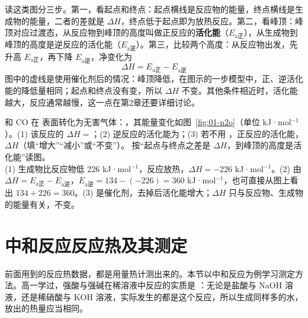 读这类图分三步。第一，看起点和终点：起点横线是反应物的能量，终点横线是生成物的能量，二者的差就是 $\Delta H$，终点低于起点即为放热反应。第二，看峰顶：峰顶对应过渡态，从反应物到峰顶的高度叫做正反应的\textbf{活化能}（$E_{\text{a正}}$），从生成物到峰顶的高度是逆反应的活化能（$E_{\text{a逆}}$）。第三，比较两个高度：从反应物出发，先升高 $E_{\text{a正}}$，再下降 $E_{\text{a逆}}$，净变化为
\[\Delta H=E_{\text{a正}}-E_{\text{a逆}}\]
图中的虚线是使用催化剂后的情况：峰顶降低，在图示的一步模型中，正、逆活化能的降低量相同；起点和终点没有变，所以 $\Delta H$ 不变。其他条件相近时，活化能越大，反应通常越慢，这一点在第2章还要详细讨论。

\begin{liti}[基础]
 和 CO 在  表面转化为无害气体：，其能量变化如图~\ref{fig:01-n2o}（单位 kJ·mol$^{-1}$）。(1) 该反应的 $\Delta H=$\tk；(2) 逆反应的活化能为\tk；(3) 若不用 ，正反应的活化能\tk，$\Delta H$\tk（填“增大”“减小”或“不变”）。
\tcblower
\silu 按“起点与终点之差是 $\Delta H$，到峰顶的高度是活化能”读图。\\
\jie (1) 生成物比反应物低 226 kJ·mol$^{-1}$，反应放热，$\Delta H=-226$ kJ·mol$^{-1}$。(2) 由 $\Delta H=E_{\text{a正}}-E_{\text{a逆}}$，$E_{\text{a逆}}=134-(-226)=360$ kJ·mol$^{-1}$，也可直接从图上看出 $134+226=360$。(3)  是催化剂，去掉后活化能增大；$\Delta H$ 只与反应物、生成物的能量有关，不变。
\end{liti}

\section{中和反应反应热及其测定}

前面用到的反应热数据，都是用量热计测出来的。本节以中和反应为例学习测定方法。高一学过，强酸与强碱在稀溶液中反应的实质是 ：无论是盐酸与 NaOH 溶液，还是稀硝酸与 KOH 溶液，实际发生的都是这个反应，所以生成同样多的水，放出的热量应当相同。

